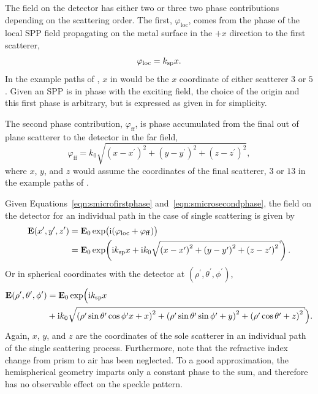 The field on the detector has either two or three two phase contributions
depending on the scattering order. The first, $\varphi_\mathrm{loc}$, comes
from the phase of the local SPP field propagating on the metal surface in the
$+x$ direction to the first scatterer,
\begin{equation}
\varphi_\mathrm{loc} = k_\mathrm{sp} x.
\label{eqn:smicrofirstphase}
\end{equation}
In the example paths of , $x$ in
 would be the $x$
coordinate of either scatterer $3$ or $5$.  Given an SPP is in phase with the
exciting field, the choice of the origin and this first phase is arbitrary,
but is expressed as given in  for simplicity.

The second phase contribution, $\varphi_\mathrm{ff}$, is phase accumulated
from the final out of plane scatterer to the detector in the far field,
\begin{equation}
\varphi_\mathrm{ff} =
k_0\sqrt{{(x-x^\prime)}^2+{(y-y^\prime)}^2+{(z-z^\prime)}^2},
\label{eqn:smicrosecondphase}
\end{equation}
where $x$, $y$, and $z$ would assume the coordinates of the final scatterer,
$3$ or $13$ in the example paths of .

Given Equations~\ref{eqn:smicrofirstphase} and~\ref{eqn:smicrosecondphase},
the field on the detector for an individual path in the case of single scattering is given by
\begin{align}
\mathbf{E}(x^\prime,y^\prime,z^\prime) &=
\mathbf{E}_0\exp\bigl(\mi(\varphi_\mathrm{loc}+\varphi_\mathrm{ff})\bigr)\\
&= \mathbf{E}_0\exp\!\left(\mi\ksp x + %
\mi k_0\sqrt{{(x-x^\prime)}^2+{(y-y^\prime)}^2+{(z-z^\prime)}^2}\right).
\label{eqn:smicrosinglescattering}
\end{align}
Or in spherical coordinates with the detector at
$(\rho^\prime,\theta^\prime,\phi^\prime)$,
\begin{align}
				\mathbf{E}(\rho^\prime,\theta^\prime,\phi^\prime) &= \mathbf{E}_0\exp\Bigl(\mi\ksp x \\
&+ \mi k_0\sqrt{{(\rho^\prime\sin\theta^\prime\cos\phi^\prime
x+x)}^2+{(\rho^\prime\sin\theta^\prime\sin\phi^\prime+y)}^2+{(\rho^\prime\cos\theta^\prime+z)}^2
} \Bigr).
\label{eqn:scattspherical}
\end{align}
Again, $x$, $y$, and $z$ are the coordinates of the sole scatterer in an
individual path of the single scattering process.  Furthermore, note that the
refractive index change from prism to air has been neglected.  To a good
approximation, the hemispherical geometry imparts only a constant phase to the
sum, and therefore has no observable effect on the speckle pattern.

